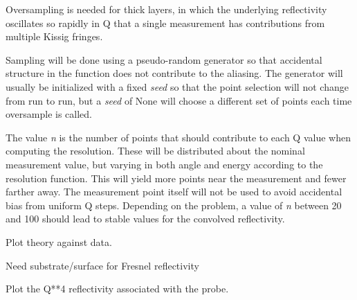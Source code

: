\documentclass[letterpaper,10pt,english]{sphinxmanual}
\begin{document}
\begin{fulllineitems}
\begin{fulllineitems}
Oversampling is needed for thick layers, in which the underlying
reflectivity oscillates so rapidly in Q that a single measurement
has contributions from multiple Kissig fringes.

Sampling will be done using a pseudo-random generator so that
accidental structure in the function does not contribute to the
aliasing.  The generator will usually be initialized with a fixed
\emph{seed} so that the point selection will not change from run to run,
but a \emph{seed} of None will choose a different set of points each time
oversample is called.

The value \emph{n} is the number of points that should contribute to
each Q value when computing the resolution.   These will be
distributed about the nominal measurement value, but varying in
both angle and energy according to the resolution function.  This
will yield more points near the measurement and fewer farther away.
The measurement point itself will not be used to avoid accidental
bias from uniform Q steps.  Depending on the problem, a value of
\emph{n} between 20 and 100 should lead to stable values for the convolved
reflectivity.

\end{fulllineitems}


\begin{fulllineitems}
\label{api/probe:refl1d.probe.Probe.parameters}
\end{fulllineitems}


\begin{fulllineitems}
\label{api/probe:refl1d.probe.Probe.plot}
Plot theory against data.

Need substrate/surface for Fresnel reflectivity

\end{fulllineitems}


\begin{fulllineitems}
\label{api/probe:refl1d.probe.Probe.plot_Q4}
Plot the Q**4 reflectivity associated with the probe.

\end{fulllineitems}


\end{fulllineitems}
\end{document}
